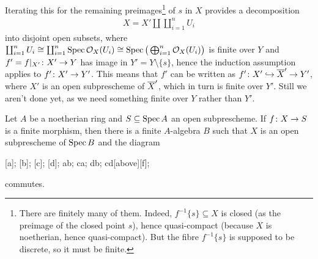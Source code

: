 \documentclass[a4paper,parskip=half,numbers=enddot, DIV=12]{scrreprt}
\begin{document}
Iterating this for the remaining preimages\footnote{There are finitely many of them. Indeed, $f^{-1}\{s\}\subseteq X$ is closed (as the preimage of the closed point $s$), hence quasi-compact (because $X$ is noetherian, hence quasi-compact). But the fibre $f^{-1}\{s\}$ is supposed to be discrete, so it must be finite.} of $s$ in $X$ provides a decomposition 
\begin{align*}
	X=X'\amalg \coprod_{i=1}^nU_i
\end{align*}
into disjoint open subsets, where $\coprod_{i=1}^nU_i\cong \coprod_{i=1}^n\operatorname{Spec} \mathcal{O}_X(U_i)\cong \operatorname{Spec}\big(\bigoplus_{i=1}^n\mathcal{O}_X(U_i)\big)$ is finite over $Y$ and $f'=f|_{X'}\colon X'\morphism Y$ has image in $Y'=Y\setminus \{s\}$, hence the induction assumption applies to $f'\colon X'\morphism Y'$. This means that $f'$ can be written as $f'\colon X'\monomorphism \ov{X}'\morphism Y'$, where $X'$ is an open subprescheme of $\overline{X}'$, which in turn is finite over $Y'$. Still we aren't done yet, as we need something finite over $Y$ rather than $Y'$.
\begin{lem}
	Let $A$ be a noetherian ring and $S\subseteq \operatorname{Spec} A$ an open subprescheme. If $f\colon X\morphism S$ is a finite morphism, then there is a finite $A$-algebra $B$ such that $X$ is an open subprescheme of $\operatorname{Spec} B$ and the diagram
	\begin{diagram*}
		[a];
		[b];
		[c];
		[d];
		\scriptsize
		\arrow ab;
		 ca;
		 db;
		\arrow cd[above][f];
	\end{diagram*}
	commutes.
\end{lem}
\end{document}
